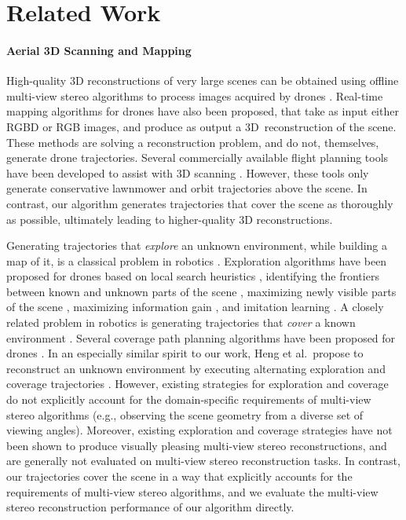 \vspace{-5pt}
\section{Related Work}

\paragraph{Aerial 3D Scanning and Mapping}
High-quality 3D reconstructions of very large scenes can be obtained using offline multi-view stereo algorithms \cite{furukawa:2015} to process images acquired by drones \cite{pix4d:2015}.
Real-time mapping algorithms for drones have also been proposed, that take as input either RGBD \cite{heng:2011,loianno:2015,michael:2012,sturm:2013} or RGB \cite{wendel:2012} images, and produce as output a 3D\ reconstruction of the scene.
These methods are solving a reconstruction problem, and do not, themselves, generate drone trajectories.
Several commercially available flight planning tools have been developed to assist with 3D scanning \cite{3dr:2017a,pix4d:2017a}.
However, these tools only generate conservative lawnmower and orbit trajectories above the scene.
In contrast, our algorithm generates trajectories that cover the scene as thoroughly as possible, ultimately leading to higher-quality 3D reconstructions.

Generating trajectories that \emph{explore} an unknown environment, while building a map of it, is a classical problem in robotics \cite{thrun:2005}.
Exploration algorithms have been proposed for drones based on local search heuristics \cite{stumberg:2016}, identifying the frontiers between known and unknown parts of the scene \cite{heng:2014,shen:2012}, maximizing newly visible parts of the scene \cite{bircher:2016}, maximizing information gain \cite{charrow:2015b,charrow:2015a}, and imitation learning \cite{choudhury:2017}.
A closely related problem in robotics is generating trajectories that \emph{cover} a known environment \cite{galceran:2013}.
Several coverage path planning algorithms have been proposed for drones \cite{alexis:2015,bircher:2015,heng:2015,hollinger:2013}.
In an especially similar spirit to our work, Heng et al.~propose to reconstruct an unknown environment by executing alternating exploration and coverage trajectories \cite{heng:2015}.
However, existing strategies for exploration and coverage do not explicitly account for the domain-specific requirements of multi-view stereo algorithms (e.g., observing the scene geometry from a diverse set of viewing angles).
Moreover, existing exploration and coverage strategies have not been shown to produce visually pleasing multi-view stereo reconstructions, and are generally not evaluated on multi-view stereo reconstruction tasks.
In contrast, our trajectories cover the scene in a way that explicitly accounts for the requirements of multi-view stereo algorithms, and we evaluate the multi-view stereo reconstruction performance of our algorithm directly.

